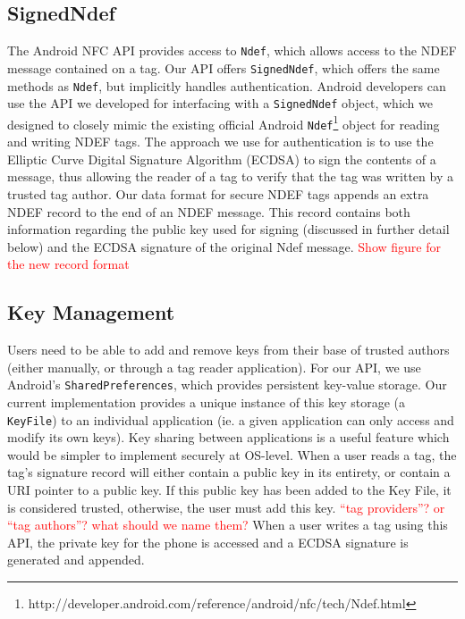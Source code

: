 \documentclass[12pt]{article}
\newcommand\TODO[1]{\textcolor{red}{#1}}
\begin{document}
\subsection{SignedNdef}
The Android NFC API provides access to \texttt{Ndef}, which allows access to the NDEF message contained on a tag.
Our API offers \texttt{SignedNdef}, which offers the same methods as \texttt{Ndef}, but implicitly handles authentication.
Android developers can use the API we developed for interfacing with a \texttt{SignedNdef} object, which we designed to closely mimic the existing official Android \texttt{Ndef}\footnote{http://developer.android.com/reference/android/nfc/tech/Ndef.html} object for reading and writing NDEF tags.
The approach we use for authentication is to use the Elliptic Curve Digital Signature Algorithm (ECDSA) to sign the contents of a message, thus allowing the reader of a tag to verify that the tag was written by a trusted tag author.
Our data format for secure NDEF tags appends an extra NDEF record to the end of an NDEF message.
This record contains both information regarding the public key used for signing (discussed in further detail below) and the ECDSA signature of the original Ndef message.
\TODO{Show figure for the new record format}

\subsection{Key Management}
Users need to be able to add and remove keys from their base of trusted authors (either manually, or through a tag reader application).
For our API, we use Android's \texttt{SharedPreferences}, which provides persistent key-value storage.
Our current implementation provides a unique instance of this key storage (a \texttt{KeyFile}) to an individual application (ie. a given application can only access and modify its own keys).
Key sharing between applications is a useful feature which would be simpler to implement securely at OS-level.
When a user reads a tag, the tag's signature record will either contain a public key in its entirety, or contain a URI pointer to a public key.
If this public key has been added to the Key File, it is considered trusted, otherwise, the user must add this key.
\TODO{``tag providers''? or ``tag authors''? what should we name them?}
When a user writes a tag using this API, the private key for the phone is accessed and a ECDSA signature is generated and appended.
\end{document}
